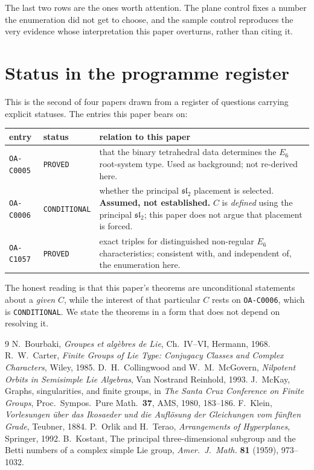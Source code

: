 \documentclass[11pt,a4paper]{article}
\theoremstyle{definition}
\theoremstyle{remark}
\newcommand{\slt}{\mathfrak{sl}_2}
\begin{document}
The last two rows are the ones worth attention. The plane control fixes a number the enumeration
did not get to choose, and the sample control reproduces the very evidence whose interpretation
this paper overturns, rather than citing it.

\section{Status in the programme register}\label{app:register}

This is the second of four papers drawn from a register of questions carrying explicit statuses.
The entries this paper bears on:

\begin{center}
\begin{tabular}{@{}llp{7.0cm}@{}}
\toprule
entry & status & relation to this paper \\
\midrule
\texttt{OA-C0005} & \texttt{PROVED} & that the binary tetrahedral data determines the $E_6$ root-system type. Used as background; not re-derived here. \\
\texttt{OA-C0006} & \texttt{CONDITIONAL} & whether the principal $\slt$ placement is selected. \textbf{Assumed, not established.} $C$ is \emph{defined} using the principal $\slt$; this paper does not argue that placement is forced. \\
\texttt{OA-C1057} & \texttt{PROVED} & exact triples for distinguished non-regular $E_6$ characteristics; consistent with, and independent of, the enumeration here. \\
\bottomrule
\end{tabular}
\end{center}

\noindent
The honest reading is that this paper's theorems are unconditional statements about a
\emph{given} $C$, while the interest of that particular $C$ rests on \texttt{OA-C0006}, which is
\texttt{CONDITIONAL}. We state the theorems in a form that does not depend on resolving it.

\begin{thebibliography}{9}
 N.~Bourbaki, \emph{Groupes et alg\`ebres de Lie}, Ch.~IV--VI, Hermann, 1968.
 R.~W.~Carter, \emph{Finite Groups of Lie Type: Conjugacy Classes and Complex
  Characters}, Wiley, 1985.
 D.~H.~Collingwood and W.~M.~McGovern, \emph{Nilpotent Orbits in
  Semisimple Lie Algebras}, Van Nostrand Reinhold, 1993.
 J.~McKay, Graphs, singularities, and finite groups, in \emph{The Santa Cruz
  Conference on Finite Groups}, Proc.\ Sympos.\ Pure Math.\ \textbf{37}, AMS, 1980, 183--186.
 F.~Klein, \emph{Vorlesungen \"uber das Ikosaeder und die Aufl\"osung der
  Gleichungen vom f\"unften Grade}, Teubner, 1884.
 P.~Orlik and H.~Terao, \emph{Arrangements of Hyperplanes}, Springer, 1992.
 B.~Kostant, The principal three-dimensional subgroup and the Betti numbers of
  a complex simple Lie group, \emph{Amer.\ J.\ Math.} \textbf{81} (1959), 973--1032.
\end{thebibliography}
\end{document}
